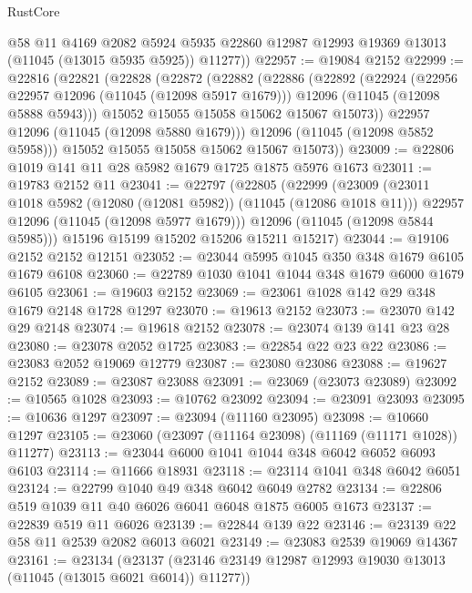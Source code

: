 \begin{lexlean}{RustCore}
\begin{coremodule}
        @58
        @11
        @4169
        @2082
        @5924
        @5935
        @22860
        @12987
        @12993
        @19369
        @13013
        (@11045 (@13015 @5935 @5925))
        @11277))
@22957 := @19084 @2152
@22999 := @22816
    (@22821
      (@22828
        (@22872
          (@22882
            (@22886
              (@22892
                (@22924
                  (@22956 @22957 @12096 (@11045 (@12098 @5917 @1679)))
                  @12096
                  (@11045 (@12098 @5888 @5943)))
                @15052
                @15055
                @15058
                @15062
                @15067
                @15073))
            @22957
            @12096
            (@11045 (@12098 @5880 @1679)))
          @12096
          (@11045 (@12098 @5852 @5958)))
        @15052
        @15055
        @15058
        @15062
        @15067
        @15073))
@23009 := @22806 @1019 @141 @11 @28 @5982 @1679 @1725 @1875 @5976 @1673
@23011 := @19783 @2152 @11
@23041 := @22797
    (@22805
      (@22999
        (@23009
          (@23011 @1018 @5982 (@12080 (@12081 @5982)) (@11045 (@12086 @1018 @11)))
          @22957
          @12096
          (@11045 (@12098 @5977 @1679)))
        @12096
        (@11045 (@12098 @5844 @5985)))
      @15196
      @15199
      @15202
      @15206
      @15211
      @15217)
@23044 := @19106 @2152 @2152 @12151
@23052 := @23044 @5995 @1045 @350 @348 @1679 @6105 @1679 @6108
@23060 := @22789 @1030 @1041 @1044 @348 @1679 @6000 @1679 @6105
@23061 := @19603 @2152
@23069 := @23061 @1028 @142 @29 @348 @1679 @2148 @1728 @1297
@23070 := @19613 @2152
@23073 := @23070 @142 @29 @2148
@23074 := @19618 @2152
@23078 := @23074 @139 @141 @23 @28
@23080 := @23078 @2052 @1725
@23083 := @22854 @22 @23 @22
@23086 := @23083 @2052 @19069 @12779
@23087 := @23080 @23086
@23088 := @19627 @2152
@23089 := @23087 @23088
@23091 := @23069 (@23073 @23089)
@23092 := @10565 @1028
@23093 := @10762 @23092
@23094 := @23091 @23093
@23095 := @10636 @1297
@23097 := @23094 (@11160 @23095)
@23098 := @10660 @1297
@23105 := @23060 (@23097 (@11164 @23098) (@11169 (@11171 @1028)) @11277)
@23113 := @23044 @6000 @1041 @1044 @348 @6042 @6052 @6093 @6103
@23114 := @11666 @18931
@23118 := @23114 @1041 @348 @6042 @6051
@23124 := @22799 @1040 @49 @348 @6042 @6049 @2782
@23134 := @22806 @519 @1039 @11 @40 @6026 @6041 @6048 @1875 @6005 @1673
@23137 := @22839 @519 @11 @6026
@23139 := @22844 @139 @22
@23146 := @23139 @22 @58 @11 @2539 @2082 @6013 @6021
@23149 := @23083 @2539 @19069 @14367
@23161 := @23134
    (@23137 (@23146 @23149 @12987 @12993 @19030 @13013 (@11045 (@13015 @6021 @6014)) @11277))

\end{coremodule}
\end{lexlean}
